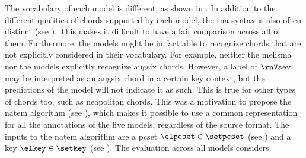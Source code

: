 
The vocabulary of each model is different, as shown in
. In addition to the different
qualities of chords supported by each model, the \gls{rna}
syntax is also often distinct (see
). This
makes it difficult to have a fair comparison across all of
them. Furthermore, the models might be in fact able to
recognize chords that are not explicitly considered in their
vocabulary. For example, neither the \gls{melisma} nor the
\textcite{mcleod2021modular} models explicitly recognize
\gls{augsix} chords. However, a label of $\rnVsev$ may be
interpreted as an \gls{augsix} chord in a certain key
context, but the predictions of the model will not indicate
it as such. This is true for other types of chords too, such
as \gls{neapolitan} chords. This was a motivation to propose
the \gls{natem} algorithm (see
), which
makes it possible to use a common representation for all the
annotations of the five models, regardless of the source
format. The inputs to the \gls{natem} algorithm are a
\gls{pcset} $\elpcset \in \setpcset$ (see
) and a key $\elkey
\in \setkey$ (see ). The
evaluation across all models considers 

